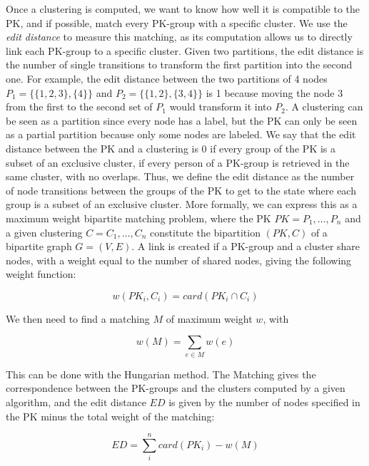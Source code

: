 Once a clustering is computed, we want to know how well it is compatible to the PK, and if possible, match every PK-group with a specific cluster.
We use the \textit{edit distance} to measure this matching, as its computation allows us to directly link each PK-group to a specific cluster.
Given two partitions, the edit distance is the number of single transitions to transform the first partition into the second one.
For example, the edit distance between the two partitions of 4 nodes $ P_1 = \{\{1,2,3\}, \{4\}\}$ and  $ P_2 = \{\{1,2\}, \{3,4\}\}$ is 1 because moving the node $3$ from the first to the second set of $P_1$ would transform it into $P_2$.
A clustering can be seen as a partition since every node has a label, but the PK can only be seen as a partial partition because only some nodes are labeled.
We say that the edit distance between the PK and a clustering is 0 if every group of the PK is a subset of an exclusive cluster, \ie if every person of a PK-group is retrieved in the same cluster, with no overlaps.
Thus, we define the edit distance as the number of node transitions between the groups of the PK to get to the state where each group is a subset of an exclusive cluster. %
More formally, we can express this as a maximum weight bipartite matching problem\cite{konovalovPartitiondistanceAssignmentProblem2005}, where the PK $PK = {P_1, \dotsc, P_n}$ and a given clustering $C = {C_1, \dotsc, C_n}$ constitute the bipartition $(PK, C)$ of a bipartite graph $G = (V, E)$.
A link is created if a PK-group and a cluster share nodes, with a weight equal to the number of shared nodes, giving the following weight function:

\begin{equation}
    w(PK_i, C_i) = card(PK_i \cap C_i)
\end{equation}

We then need to find a matching $M$ of maximum weight $w$, with

\begin{equation}
    w(M) = \sum_{e \in M}w(e)
\end{equation}

This can be done with the Hungarian method\cite{kuhnHungarianMethodAssignment1955}. The Matching gives the correspondence between the PK-groups and the clusters computed by a given algorithm, and the edit distance $ED$ is given by the number of nodes specified in the PK minus the total weight of the matching:

\begin{equation}
    ED = \sum_{i}^{n}card(PK_i) - w(M)
\end{equation}

